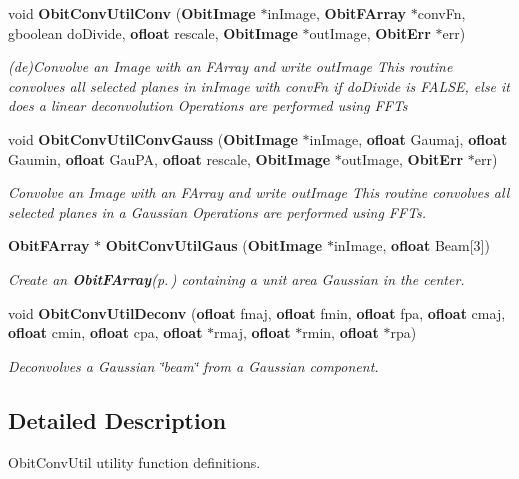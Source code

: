 \begin{CompactItemize}
\item 
void {\bf Obit\-Conv\-Util\-Conv} ({\bf Obit\-Image} $\ast$in\-Image, {\bf Obit\-FArray} $\ast$conv\-Fn, gboolean do\-Divide, {\bf ofloat} rescale, {\bf Obit\-Image} $\ast$out\-Image, {\bf Obit\-Err} $\ast$err)
\begin{CompactList}\small\item\em (de)Convolve an Image with an FArray and write out\-Image This routine convolves all selected planes in in\-Image with conv\-Fn if do\-Divide is FALSE, else it does a linear deconvolution Operations are performed using FFTs \item\end{CompactList}\item 
void {\bf Obit\-Conv\-Util\-Conv\-Gauss} ({\bf Obit\-Image} $\ast$in\-Image, {\bf ofloat} Gaumaj, {\bf ofloat} Gaumin, {\bf ofloat} Gau\-PA, {\bf ofloat} rescale, {\bf Obit\-Image} $\ast$out\-Image, {\bf Obit\-Err} $\ast$err)
\begin{CompactList}\small\item\em Convolve an Image with an FArray and write out\-Image This routine convolves all selected planes in a Gaussian Operations are performed using FFTs. \item\end{CompactList}\item 
{\bf Obit\-FArray} $\ast$ {\bf Obit\-Conv\-Util\-Gaus} ({\bf Obit\-Image} $\ast$in\-Image, {\bf ofloat} Beam[3])
\begin{CompactList}\small\item\em Create an {\bf Obit\-FArray}{\rm (p.\,\pageref{structObitFArray})} containing a unit area Gaussian in the center. \item\end{CompactList}\item 
void {\bf Obit\-Conv\-Util\-Deconv} ({\bf ofloat} fmaj, {\bf ofloat} fmin, {\bf ofloat} fpa, {\bf ofloat} cmaj, {\bf ofloat} cmin, {\bf ofloat} cpa, {\bf ofloat} $\ast$rmaj, {\bf ofloat} $\ast$rmin, {\bf ofloat} $\ast$rpa)
\begin{CompactList}\small\item\em Deconvolves a Gaussian \char`\"{}beam\char`\"{} from a Gaussian component. \item\end{CompactList}\end{CompactItemize}


\subsection{Detailed Description}
Obit\-Conv\-Util utility function definitions. 

